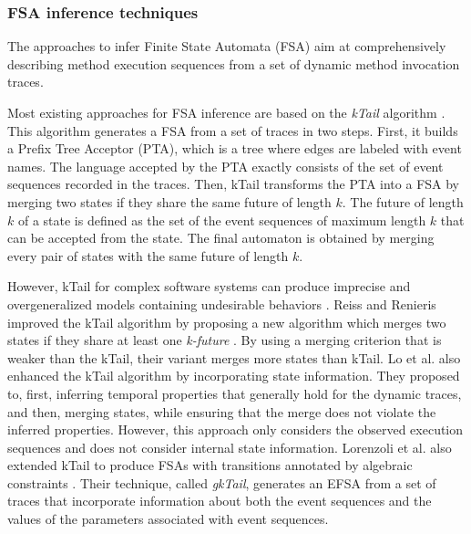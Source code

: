 \subsubsection{FSA inference techniques}
\label{sec:passive-fsa}

The approaches to infer Finite State Automata (FSA) aim at
comprehensively describing method execution sequences from a set
of dynamic method invocation traces.

Most existing approaches for FSA inference are based on the
\textit{kTail} algorithm \cite{5009015}. This algorithm generates
a FSA from a set of traces in two steps.  First, it builds a
Prefix Tree Acceptor (PTA), which is a tree where edges are
labeled with event names.  The language accepted by the PTA
exactly consists of the set of event sequences recorded in the
traces. Then, kTail transforms the PTA into a FSA by merging two
states if they share the same future of length $k$. The future of
length $k$ of a state is defined as the set of the event
sequences of maximum length $k$ that can be accepted from the
state. The final automaton is obtained by merging every pair of
states with the same future of length $k$.

However, kTail for complex software systems can produce imprecise
and overgeneralized models containing undesirable behaviors
\cite{4023976}. Reiss and Renieris improved the kTail algorithm
by proposing a new algorithm which merges two states if they
share at least one \textit{k-future} \cite{919096}. By using a
merging criterion that is weaker than the kTail, their variant
merges more states than kTail.
Lo et al. \cite{Lo:2009:ASB:1595696.1595761} also enhanced the
kTail algorithm by incorporating state information. They
proposed to, first, inferring temporal properties that generally
hold for the dynamic traces, and then, merging states, while
ensuring that the merge does not violate the inferred properties.
However, this approach only considers the observed execution
sequences and does not consider internal state information.
Lorenzoli et al. also extended kTail to produce FSAs with
transitions annotated by algebraic constraints
\cite{Lorenzoli2008}. Their technique, called \textit{gkTail},
generates an EFSA from a set of traces that incorporate
information about both the event sequences and the values of the
parameters associated with event sequences.

